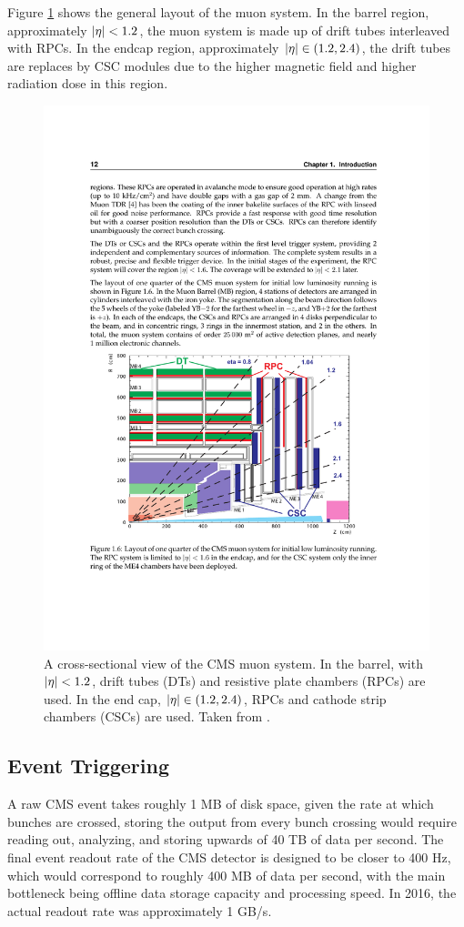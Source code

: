       Figure \ref{fig:muon_system} shows the general layout of the muon system. In the barrel region, approximately $\lvert \eta \rvert < 1.2$, the muon system is made up of drift tubes interleaved with RPCs. In the endcap region, approximately $\lvert \eta \rvert \in (1.2,2.4)$, the drift tubes are replaces by CSC modules due to the higher magnetic field and higher radiation dose in this region.

    \begin{figure}[h!]
      \centering
      \includegraphics[width=.9\textwidth]{figures/muon_system.pdf}
      \caption{A cross-sectional view of the CMS muon system. In the barrel, with $\lvert \eta \rvert<1.2$, drift tubes (DTs) and resistive plate chambers (RPCs) are used. In the end cap, $\lvert \eta \rvert \in (1.2,2.4)$, RPCs and cathode strip chambers (CSCs) are used. Taken from \cite{cms_tdr}.}
      \label{fig:muon_system}
    \end{figure}

  \subsection{Event Triggering} \label{sec:event_triggering}
    A raw CMS event takes roughly 1 MB of disk space, given the rate at which bunches are crossed, storing the output from every bunch crossing would require reading out, analyzing, and storing upwards of 40 TB of data per second.\cite{trigger_tdr} The final event readout rate of the CMS detector is designed to be closer to 400 Hz, which would correspond to roughly 400 MB of data per second, with the main bottleneck being offline data storage capacity and processing speed. In 2016, the actual readout rate was approximately 1 GB/s.

